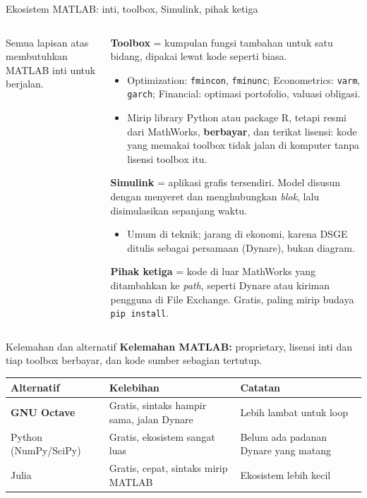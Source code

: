 \documentclass[aspectratio=169,11pt]{beamer}
\begin{document}
\begin{frame}[fragile]{Ekosistem MATLAB: inti, toolbox, Simulink, pihak ketiga}
\begin{columns}[T]
\begin{column}{0.42\textwidth}
\vspace{0.4em}
\raggedright\scriptsize
Semua lapisan atas \alert{membutuhkan MATLAB inti} untuk berjalan.
\end{column}
\begin{column}{0.56\textwidth}
\scriptsize
\textbf{Toolbox} = kumpulan fungsi tambahan untuk satu bidang,
dipakai lewat kode seperti biasa.
\begin{itemize}
  \item Optimization: \texttt{fmincon}, \texttt{fminunc};
        Econometrics: \texttt{varm}, \texttt{garch};
        Financial: optimasi portofolio, valuasi obligasi.
  \item \alert{Mirip library Python atau package R}, tetapi resmi dari
        MathWorks, \textbf{berbayar}, dan terikat lisensi: kode yang memakai
        toolbox tidak jalan di komputer tanpa lisensi toolbox itu.
\end{itemize}
\textbf{Simulink} = aplikasi grafis tersendiri. Model disusun dengan
menyeret dan menghubungkan \emph{blok}, lalu disimulasikan sepanjang waktu.
\begin{itemize}
  \item Umum di teknik; jarang di ekonomi, karena DSGE ditulis sebagai
        persamaan (Dynare), bukan diagram.
\end{itemize}
\textbf{Pihak ketiga} = kode di luar MathWorks yang ditambahkan ke
\emph{path}, seperti Dynare atau kiriman pengguna di File Exchange.
Gratis, paling mirip budaya \texttt{pip install}.
\end{column}
\end{columns}
\end{frame}

\begin{frame}{Kelemahan dan alternatif}
\textbf{Kelemahan MATLAB:} proprietary, lisensi inti dan tiap toolbox
berbayar, dan kode sumber sebagian tertutup.
\vspace{0.6em}

\centering\small
\renewcommand{\arraystretch}{1.2}
\begin{tabular}{L{3.4cm} L{4.8cm} L{4.4cm}}
\toprule
Alternatif & Kelebihan & Catatan \\
\midrule
\textbf{GNU Octave} & Gratis, sintaks hampir sama, jalan Dynare & Lebih lambat untuk loop \\
Python (NumPy/SciPy) & Gratis, ekosistem sangat luas & Belum ada padanan Dynare yang matang \\
Julia & Gratis, cepat, sintaks mirip MATLAB & Ekosistem lebih kecil \\
\bottomrule
\end{tabular}
\end{frame}
\end{document}
